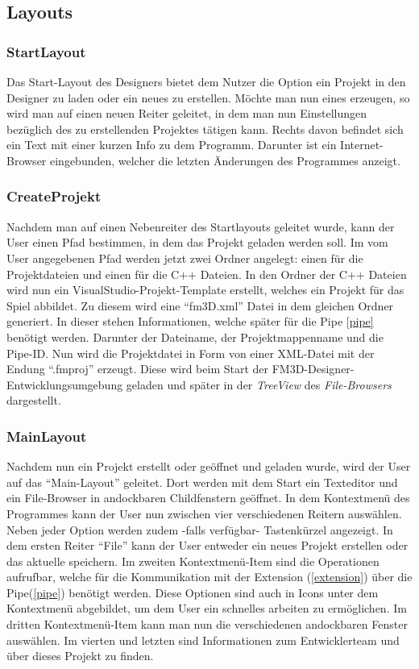 \subsection{Layouts}
\subsubsection{StartLayout}
\label{startlayout}
Das Start-Layout des Designers bietet dem Nutzer die Option ein Projekt in den Designer zu laden oder ein neues zu erstellen. Möchte man nun eines erzeugen, so wird man auf einen neuen Reiter geleitet, in dem man nun Einstellungen bezüglich des zu erstellenden Projektes tätigen kann. Rechts davon befindet sich ein Text mit einer kurzen Info zu dem Programm. Darunter ist ein Internet-Browser eingebunden, welcher die letzten Änderungen des Programmes anzeigt.

\subsubsection{CreateProjekt}
Nachdem man auf einen Nebenreiter des Startlayouts geleitet wurde, kann der User einen Pfad bestimmen, in dem das Projekt geladen werden soll. Im vom User angegebenen Pfad werden jetzt zwei Ordner angelegt: einen für die Projektdateien und einen für die C++ Dateien. 
In den Ordner der C++ Dateien wird nun ein VisualStudio-Projekt-Template erstellt, welches ein Projekt für das Spiel abbildet. Zu diesem wird eine "`fm3D.xml"' Datei in dem gleichen Ordner generiert. In dieser stehen Informationen, welche später für die Pipe \ref{pipe} benötigt werden. Darunter der Dateiname, der Projektmappenname und die Pipe-ID.
Nun wird die Projektdatei in Form von einer XML-Datei mit der Endung "`.fmproj"' erzeugt. Diese wird beim Start der FM3D-Designer-Entwicklungsumgebung geladen und später in der \textit{TreeView} des \textit{File-Browsers} dargestellt.

\subsubsection{MainLayout}
\label{mainlayout}
Nachdem nun ein Projekt erstellt oder geöffnet und geladen wurde, wird der User auf das "`Main-Layout"' geleitet. Dort werden mit dem Start ein Texteditor und ein File-Browser in andockbaren Childfenstern geöffnet. In dem Kontextmenü des Programmes kann der User nun zwischen vier verschiedenen Reitern auswählen. Neben jeder Option werden zudem -falls verfügbar- Tastenkürzel angezeigt. 
In dem ersten Reiter "`File"' kann der User entweder ein neues Projekt erstellen oder das aktuelle speichern. 
Im zweiten Kontextmenü-Item sind die Operationen aufrufbar, welche für die Kommunikation mit der Extension (\cref{extension}) über die Pipe(\cref{pipe}) benötigt werden. Diese Optionen sind auch in Icons unter dem Kontextmenü abgebildet, um dem User ein schnelles arbeiten zu ermöglichen. Im dritten Kontextmenü-Item kann man nun die verschiedenen andockbaren Fenster auswählen. Im vierten und letzten sind Informationen zum Entwicklerteam und über dieses Projekt zu finden.

